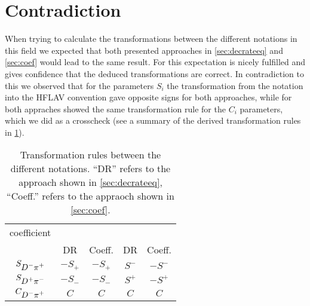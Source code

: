 \section{Contradiction}

When trying to calculate the transformations between the different notations in this field we expected that both presented
approaches in \cref{sec:decrateeq} and \cref{sec:coef} would lead to the same result. For \babar this expectation is nicely
fulfilled and gives confidence that the deduced transformations are correct. In contradiction to this we observed that for
the \CP parameters $S_{i}$ the transformation from the \belle notation into the HFLAV convention gave opposite signs for
both approaches, while for both appraches showed the same transformation rule for the $C_i$ parameters, which we did as a
crosscheck (see a summary of the derived transformation rules in \ref{tab:trans_sum}).
\begin{table}[htbp]
	\centering
	\caption{Transformation rules between the different notations. \enquote{DR} refers to the approach shown in \cref{sec:decrateeq},
	\enquote{Coeff.} refers to the appraoch shown in \cref{sec:coef}.}
	\begin{tabular}{c|cc|cc}
		\toprule
		\CP coefficient & \multicolumn{2}{c|}{\babar} & \multicolumn{2}{c}{\belle} \\
		 & DR & Coeff. & DR & Coeff. \\
		\midrule
        $S_{\mbox{\ensuremath{D^{-}\pi^{+}}}}$ & $-S_{+}$ & $-S_{+}$ & $S^{-}$ & $-S^{-}$\\
        $S_{\mbox{\ensuremath{D^{+}\pi^{-}}}}$ & $-S_{-}$ & $-S_{-}$ & $S^{+}$ & $-S^{+}$ \\
        $C_{\mbox{\ensuremath{D^{-}\pi^{+}}}}$ & $C$ & $C$ & $C$ & $C$\\
		\bottomrule
	\end{tabular}
	\label{tab:trans_sum}
\end{table}
